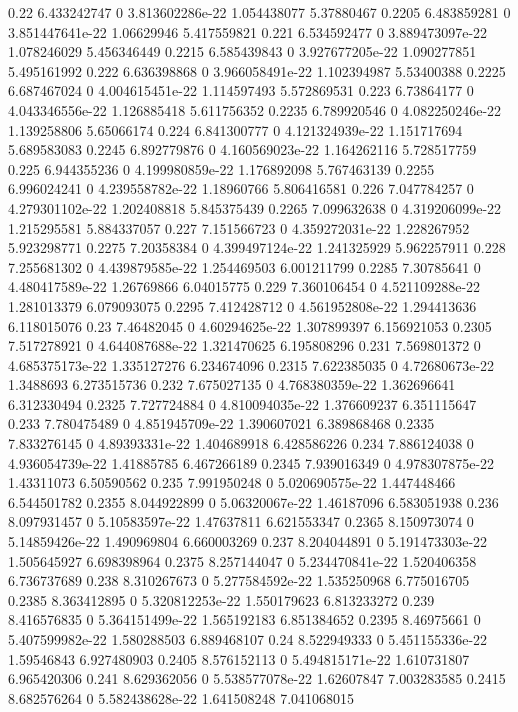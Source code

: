 {0.22 6.433242747 0 3.813602286e-22 1.054438077 5.37880467
0.2205 6.483859281 0 3.851447641e-22 1.06629946 5.417559821
0.221 6.534592477 0 3.889473097e-22 1.078246029 5.456346449
0.2215 6.585439843 0 3.927677205e-22 1.090277851 5.495161992
0.222 6.636398868 0 3.966058491e-22 1.102394987 5.53400388
0.2225 6.687467024 0 4.004615451e-22 1.114597493 5.572869531
0.223 6.73864177 0 4.043346556e-22 1.126885418 5.611756352
0.2235 6.789920546 0 4.082250246e-22 1.139258806 5.65066174
0.224 6.841300777 0 4.121324939e-22 1.151717694 5.689583083
0.2245 6.892779876 0 4.160569023e-22 1.164262116 5.728517759
0.225 6.944355236 0 4.199980859e-22 1.176892098 5.767463139
0.2255 6.996024241 0 4.239558782e-22 1.18960766 5.806416581
0.226 7.047784257 0 4.279301102e-22 1.202408818 5.845375439
0.2265 7.099632638 0 4.319206099e-22 1.215295581 5.884337057
0.227 7.151566723 0 4.359272031e-22 1.228267952 5.923298771
0.2275 7.20358384 0 4.399497124e-22 1.241325929 5.962257911
0.228 7.255681302 0 4.439879585e-22 1.254469503 6.001211799
0.2285 7.30785641 0 4.480417589e-22 1.26769866 6.04015775
0.229 7.360106454 0 4.521109288e-22 1.281013379 6.079093075
0.2295 7.412428712 0 4.561952808e-22 1.294413636 6.118015076
0.23 7.46482045 0 4.60294625e-22 1.307899397 6.156921053
0.2305 7.517278921 0 4.644087688e-22 1.321470625 6.195808296
0.231 7.569801372 0 4.685375173e-22 1.335127276 6.234674096
0.2315 7.622385035 0 4.72680673e-22 1.3488693 6.273515736
0.232 7.675027135 0 4.768380359e-22 1.362696641 6.312330494
0.2325 7.727724884 0 4.810094035e-22 1.376609237 6.351115647
0.233 7.780475489 0 4.851945709e-22 1.390607021 6.389868468
0.2335 7.833276145 0 4.89393331e-22 1.404689918 6.428586226
0.234 7.886124038 0 4.936054739e-22 1.41885785 6.467266189
0.2345 7.939016349 0 4.978307875e-22 1.43311073 6.50590562
0.235 7.991950248 0 5.020690575e-22 1.447448466 6.544501782
0.2355 8.044922899 0 5.06320067e-22 1.46187096 6.583051938
0.236 8.097931457 0 5.10583597e-22 1.47637811 6.621553347
0.2365 8.150973074 0 5.14859426e-22 1.490969804 6.660003269
0.237 8.204044891 0 5.191473303e-22 1.505645927 6.698398964
0.2375 8.257144047 0 5.234470841e-22 1.520406358 6.736737689
0.238 8.310267673 0 5.277584592e-22 1.535250968 6.775016705
0.2385 8.363412895 0 5.320812253e-22 1.550179623 6.813233272
0.239 8.416576835 0 5.364151499e-22 1.565192183 6.851384652
0.2395 8.46975661 0 5.407599982e-22 1.580288503 6.889468107
0.24 8.522949333 0 5.451155336e-22 1.59546843 6.927480903
0.2405 8.576152113 0 5.494815171e-22 1.610731807 6.965420306
0.241 8.629362056 0 5.538577078e-22 1.62607847 7.003283585
0.2415 8.682576264 0 5.582438628e-22 1.641508248 7.041068015
}
